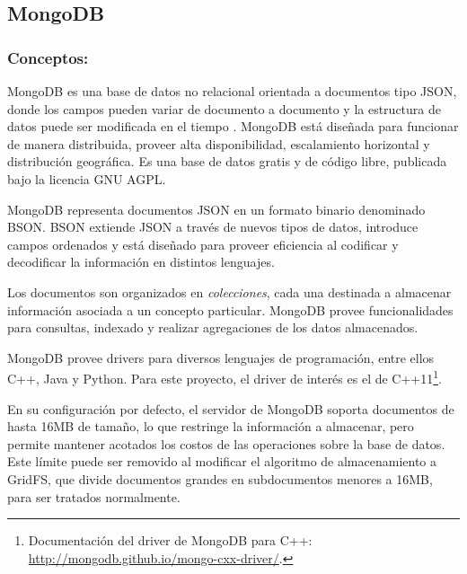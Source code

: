 \subsection{MongoDB}\label{sec:mongodb}

\subsubsection{Conceptos:}

MongoDB es una base de datos no relacional orientada a documentos tipo JSON, donde los campos pueden variar de documento a documento y la estructura de datos puede ser modificada en el tiempo \cite{MongoDB}. MongoDB está diseñada para funcionar de manera distribuida, proveer alta disponibilidad, escalamiento horizontal y distribución geográfica. Es una base de datos gratis y de código libre, publicada bajo la licencia GNU AGPL.

MongoDB representa documentos JSON en un formato binario denominado BSON. BSON extiende JSON a través de nuevos tipos de datos, introduce campos ordenados y está diseñado para proveer eficiencia al codificar y decodificar la información en distintos lenguajes. 

Los documentos son organizados en \textit{colecciones}, cada una destinada a almacenar información asociada a un concepto particular. MongoDB provee funcionalidades para consultas, indexado y realizar agregaciones de los datos almacenados.

MongoDB provee drivers para diversos lenguajes de programación, entre ellos C++, Java y Python. Para este proyecto, el driver de interés es el de C++11\footnote{Documentación del driver de MongoDB para C++:  \url{http://mongodb.github.io/mongo-cxx-driver/}.}.

En su configuración por defecto, el servidor de MongoDB soporta documentos de hasta 16MB de tamaño, lo que restringe la información a almacenar, pero permite mantener acotados los costos de las operaciones sobre la base de datos. Este límite puede ser removido al modificar el algoritmo de almacenamiento a GridFS, que divide documentos grandes en subdocumentos menores a 16MB, para ser tratados normalmente.


